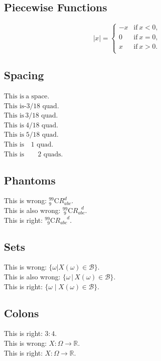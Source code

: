 \documentclass[a4paper,10pt]{article}
\begin{document}
    \subsection{Piecewise Functions}
    \begin{equation*}
        |x| =
        \begin{cases}
            -x & \text{if} \  x < 0, \\
             0 & \text{if} \  x = 0, \\
             x & \text{if} \  x > 0. \\
        \end{cases}
    \end{equation*}
    \subsection{Spacing}
    $ \text{This is} \  \text{a space.} $ \\
    $ \text{This is} \! \text{-3/18 quad.} $ \\
    $ \text{This is} \, \text{3/18 quad.} $ \\
    $ \text{This is} \: \text{4/18 quad.} $ \\
    $ \text{This is} \; \text{5/18 quad.} $ \\
    $ \text{This is} \quad \text{1 quad.} $ \\
    $ \text{This is} \qquad \text{2 quads.} $
    \subsection{Phantoms}
    This is wrong: ${}^{99}_{ 9}\text{C}R_{abc}^{   d}$.\\
    This is also wrong: ${}^{99}_{\ 9}\text{C}R_{abc}^{\ \ \ d}$.\\
    This is right: ${}^{99}_{\phantom{9}9}\text{C}R_{abc}^{\phantom{abc}d}$.
    \subsection{Sets}
    This is wrong: $\{\omega|X(\omega)\in\mathcal{B}\}$.\\
    This is also wrong: $\{\omega\,|\,X(\omega)\in\mathcal{B}\}$.\\
    This is right: $\{\omega\mid X(\omega)\in\mathcal{B}\}$.\\
    \subsection{Colons}
    This is right: $3:4$.\\
    This is wrong: $X:\Omega\to\mathbb{R}$.\\
    This is right: $X\colon\Omega\to\mathbb{R}$.\\
\end{document}

